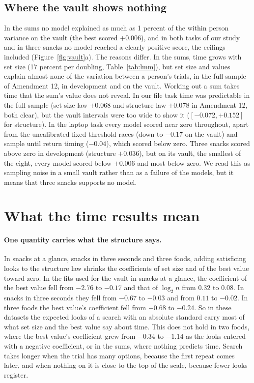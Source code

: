 \documentclass[11pt]{article}
\begin{document}
\subsection{Where the vault shows nothing}

In the sums no model explained as much as 1 percent of the within person variance on the vault (the best scored $+0.006$), and in both tasks of our study and in three snacks no model reached a clearly positive score, the ceilings included (Figure~\ref{fig:vault}a). The reasons differ. In the sums, time grows with set size (17 percent per doubling, Table~\ref{tab:lmm}), but set size and values explain almost none of the variation between a person's trials, in the full sample of Amendment 12, in development and on the vault. Working out a sum takes time that the sum's value does not reveal. In our file task time was predictable in the full sample (set size law $+0.068$ and structure law $+0.078$ in Amendment 12, both clear), but the vault intervals were too wide to show it ($[-0.072, +0.152]$ for structure). In the laptop task every model scored near zero throughout, apart from the uncalibrated fixed threshold races (down to $-0.17$ on the vault) and sample until return timing ($-0.04$), which scored below zero. Three snacks scored above zero in development (structure $+0.036$), but on its vault, the smallest of the eight, every model scored below $+0.006$ and most below zero. We read this as sampling noise in a small vault rather than as a failure of the models, but it means that three snacks supports no model.

\section{What the time results mean}

\paragraph{One quantity carries what the structure says.} In snacks at a glance, snacks in three seconds and three foods, adding satisficing looks to the structure law shrinks the coefficients of set size and of the best value toward zero. In the fits used for the vault in snacks at a glance, the coefficient of the best value fell from $-2.76$ to $-0.17$ and that of $\log_2 n$ from $0.32$ to $0.08$. In snacks in three seconds they fell from $-0.67$ to $-0.03$ and from $0.11$ to $-0.02$. In three foods the best value's coefficient fell from $-0.68$ to $-0.24$. So in these datasets the expected looks of a search with an absolute standard carry most of what set size and the best value say about time. This does not hold in two foods, where the best value's coefficient grew from $-0.34$ to $-1.14$ as the looks entered with a negative coefficient, or in the sums, where nothing predicts time. Search takes longer when the trial has many options, because the first repeat comes later, and when nothing on it is close to the top of the scale, because fewer looks register.
\end{document}
